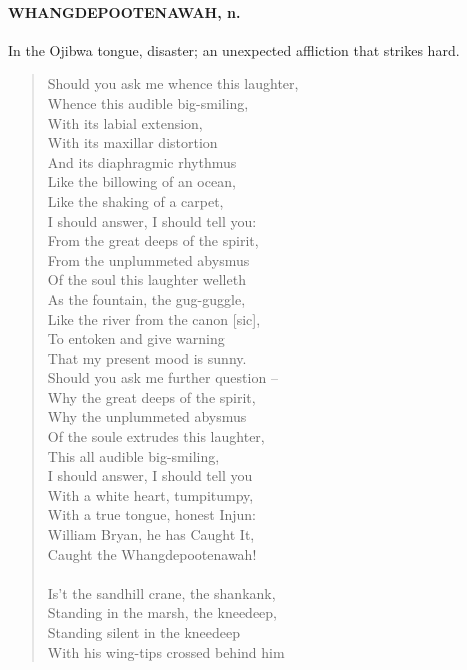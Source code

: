 \documentclass[11pt]{article}
\begin{document}
\paragraph{WHANGDEPOOTENAWAH, n.}  In the Ojibwa tongue, disaster; an unexpected
affliction that strikes hard.

\begin{quote}   Should you ask me whence this laughter, \\
  Whence this audible big-smiling, \\
  With its labial extension, \\
  With its maxillar distortion \\
  And its diaphragmic rhythmus \\
  Like the billowing of an ocean, \\
  Like the shaking of a carpet, \\
  I should answer, I should tell you: \\
  From the great deeps of the spirit, \\
  From the unplummeted abysmus \\
  Of the soul this laughter welleth \\
  As the fountain, the gug-guggle, \\
  Like the river from the canon [sic], \\
  To entoken and give warning \\
  That my present mood is sunny. \\
  Should you ask me further question -- \\
  Why the great deeps of the spirit, \\
  Why the unplummeted abysmus \\
  Of the soule extrudes this laughter, \\
  This all audible big-smiling, \\
  I should answer, I should tell you \\
  With a white heart, tumpitumpy, \\
  With a true tongue, honest Injun: \\
  William Bryan, he has Caught It, \\
  Caught the Whangdepootenawah! \\
 \\
  Is't the sandhill crane, the shankank, \\
  Standing in the marsh, the kneedeep, \\
  Standing silent in the kneedeep \\
  With his wing-tips crossed behind him \\

\end{quote}
\end{document}
